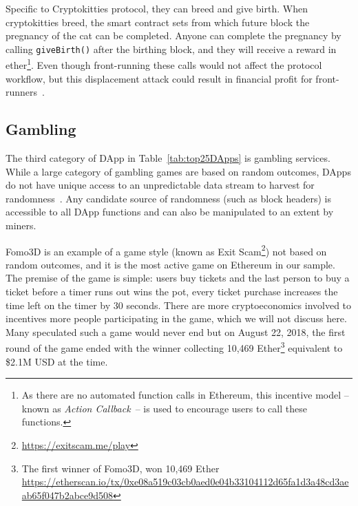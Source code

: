     
Specific to Cryptokitties protocol, they can breed and give birth. When cryptokitties breed, the smart contract sets from which future block the pregnancy of the cat can be completed. Anyone can complete the pregnancy by calling \texttt{giveBirth()} after the birthing block, and they will receive a reward in ether\footnote{As there are no automated function calls in Ethereum, this incentive model --known as \textit{Action Callback}~\cite{klerosGeneralizedFrontrunner2019}-- is used to encourage users to call these functions.}. Even though front-running these calls would not affect the protocol workflow, but this displacement attack could result in financial profit for front-runners~\cite{qin2021attacking,cryptoMidwivesBot2018}.


\subsection{Gambling}
\label{sec:gambling}

The third category of DApp in Table~\ref{tab:top25DApps} is gambling services. While a large category of gambling games are based on random outcomes, DApps do not have unique access to an unpredictable data stream to harvest for randomness~\cite{pierrot2018malleability}. Any candidate source of randomness (such as block headers) is accessible to all DApp functions and can also be manipulated to an extent by miners.


\textsf{Fomo3D} is an example of a game style (known as \textsf{Exit Scam}\footnote{\url{https://exitscam.me/play}}) not based on random outcomes, and it is the most active game on Ethereum in our sample. The premise of the game is simple: users buy tickets and the last person to buy a ticket before a timer runs out wins the pot, every ticket purchase increases the time left on the timer by 30 seconds. There are more cryptoeconomics involved to incentives more people participating in the game, which we will not discuss here. Many speculated such a game would never end but on August 22, 2018, the first round of the game ended with the winner collecting 10,469 Ether\footnote{The first winner of Fomo3D, won 10,469 Ether \url{https://etherscan.io/tx/0xe08a519c03cb0aed0e04b33104112d65fa1d3a48cd3aeab65f047b2abce9d508}} equivalent to \$2.1M USD at the time.

